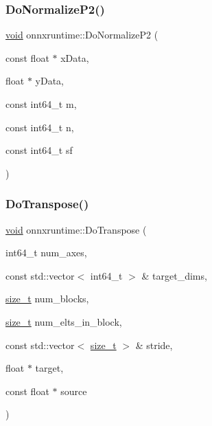 \mbox{\label{namespaceonnxruntime_ae496da6e75c2924416f85d7eb41da7c0}} 
\subsubsection{\texorpdfstring{Do\+Normalize\+P2()}{DoNormalizeP2()}}
{\footnotesize\ttfamily \mbox{\hyperlink{mlasi_8h_a88f941d423cb2a819b70a1358982b1a6}{void}} onnxruntime\+::\+Do\+Normalize\+P2 (\begin{DoxyParamCaption}\item[{const float $\ast$}]{x\+Data,  }\item[{float $\ast$}]{y\+Data,  }\item[{const int64\+\_\+t}]{m,  }\item[{const int64\+\_\+t}]{n,  }\item[{const int64\+\_\+t}]{sf }\end{DoxyParamCaption})}

\mbox{\label{namespaceonnxruntime_a138af3ff525d223a802d265a9074cd57}} 
\subsubsection{\texorpdfstring{Do\+Transpose()}{DoTranspose()}}
{\footnotesize\ttfamily \mbox{\hyperlink{mlasi_8h_a88f941d423cb2a819b70a1358982b1a6}{void}} onnxruntime\+::\+Do\+Transpose (\begin{DoxyParamCaption}\item[{int64\+\_\+t}]{num\+\_\+axes,  }\item[{const std\+::vector$<$ int64\+\_\+t $>$ \&}]{target\+\_\+dims,  }\item[{\mbox{\hyperlink{mlasi_8h_a503efbc1c6e50825320ad909366b78ab}{size\+\_\+t}}}]{num\+\_\+blocks,  }\item[{\mbox{\hyperlink{mlasi_8h_a503efbc1c6e50825320ad909366b78ab}{size\+\_\+t}}}]{num\+\_\+elts\+\_\+in\+\_\+block,  }\item[{const std\+::vector$<$ \mbox{\hyperlink{mlasi_8h_a503efbc1c6e50825320ad909366b78ab}{size\+\_\+t}} $>$ \&}]{stride,  }\item[{float $\ast$}]{target,  }\item[{const float $\ast$}]{source }\end{DoxyParamCaption})}

